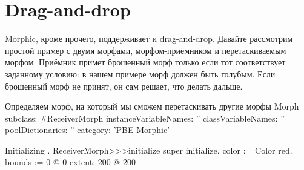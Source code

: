 \documentclass[a4paper,10pt,twoside]{book}
\begin{document}

\section{Drag-and-drop}

Morphic, кроме прочего, поддерживает и drag-and-drop. Давайте рассмотрим простой пример с двумя морфами, морфом-приёмником и перетаскиваемым морфом.
Приёмник примет брошенный морф только если тот соответствует заданному условию: в нашем примере морф должен быть голубым. Если брошенный морф не принят, он сам решает, что делать дальше.

\begin{classdef}{Определяем морф, на который мы сможем перетаскивать другие морфы}
Morph subclass: #ReceiverMorph
	instanceVariableNames: ''
	classVariableNames: ''
	poolDictionaries: ''
	category: 'PBE-Morphic'
\end{classdef}

\begin{method}{Initializing .}
ReceiverMorph>>>initialize
	super initialize.
	color := Color red.
	bounds := 0 @ 0 extent: 200 @ 200
\end{method}
\end{document}

